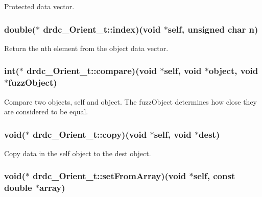 Protected data vector. 

\hypertarget{structdrdc__Orient__t_7d099087aa69fc1aedffd77f7744c441}{
\subsubsection[index]{\setlength{\rightskip}{0pt plus 5cm}double($\ast$ {\bf drdc\_\-Orient\_\-t::index})(void $\ast$self, unsigned char n)}}
\label{structdrdc__Orient__t_7d099087aa69fc1aedffd77f7744c441}


Return the nth element from the object data vector. 

\hypertarget{structdrdc__Orient__t_bc95816c336a44ee2ed6a3e739070971}{
\subsubsection[compare]{\setlength{\rightskip}{0pt plus 5cm}int($\ast$ {\bf drdc\_\-Orient\_\-t::compare})(void $\ast$self, void $\ast$object, void $\ast$fuzzObject)}}
\label{structdrdc__Orient__t_bc95816c336a44ee2ed6a3e739070971}


Compare two objects, self and object. The fuzzObject determines how close they are considered to be equal. 

\hypertarget{structdrdc__Orient__t_33504e9b07aebd96d0b3792acfc13d99}{
\subsubsection[copy]{\setlength{\rightskip}{0pt plus 5cm}void($\ast$ {\bf drdc\_\-Orient\_\-t::copy})(void $\ast$self, void $\ast$dest)}}
\label{structdrdc__Orient__t_33504e9b07aebd96d0b3792acfc13d99}


Copy data in the self object to the dest object. 

\hypertarget{structdrdc__Orient__t_08c035799b9a3a3095b93a230dde7373}{
\subsubsection[setFromArray]{\setlength{\rightskip}{0pt plus 5cm}void($\ast$ {\bf drdc\_\-Orient\_\-t::setFromArray})(void $\ast$self, const double $\ast$array)}}
\label{structdrdc__Orient__t_08c035799b9a3a3095b93a230dde7373}


